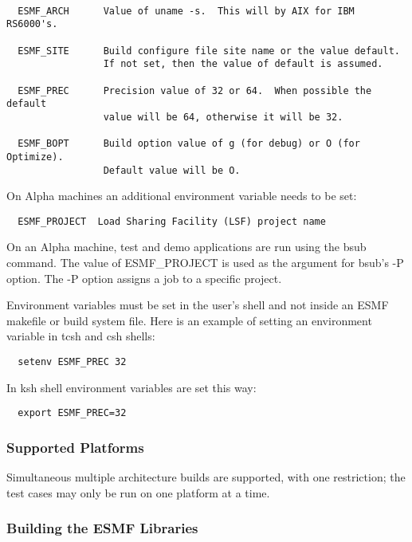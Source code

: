 \begin{verbatim}

  ESMF_ARCH      Value of uname -s.  This will by AIX for IBM RS6000's.

  ESMF_SITE      Build configure file site name or the value default.
                 If not set, then the value of default is assumed.

  ESMF_PREC      Precision value of 32 or 64.  When possible the default
                 value will be 64, otherwise it will be 32.

  ESMF_BOPT      Build option value of g (for debug) or O (for Optimize). 
                 Default value will be O.

\end{verbatim}


On Alpha machines an additional environment variable needs
to be set:

\begin{verbatim}
  ESMF_PROJECT  Load Sharing Facility (LSF) project name 
\end{verbatim}

On an Alpha machine, test and demo applications are run using 
the bsub command.  The value of ESMF\_PROJECT is used as the 
argument for bsub's -P option. The -P option assigns a job to 
a specific project.  

Environment variables must be set in the user's shell and not
inside an ESMF makefile or build system file.  Here is an example 
of setting an environment variable in tcsh and csh shells:
\begin{verbatim}
  setenv ESMF_PREC 32
\end{verbatim}
In ksh shell environment variables are set this way:
\begin{verbatim}
  export ESMF_PREC=32
\end{verbatim}


\subsubsection{Supported Platforms}


Simultaneous multiple architecture builds are supported, with
one restriction; the test cases may only be run on one platform at a time. 

\subsubsection{Building the ESMF Libraries}
\label{BuildESMF}

